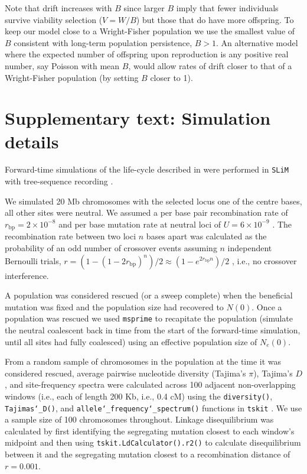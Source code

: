 \documentclass[]{article}
\begin{document}
Note that drift increases with $B$ since larger $B$ imply that fewer individuals survive viability selection ($V= W/B$) but those that do have more offspring.
To keep our model close to a Wright-Fisher population we use the smallest value of $B$ consistent with long-term population persistence, $B>1$.
An alternative model where the expected number of offspring upon reproduction is any positive real number, say Poisson with mean $B$, would allow rates of drift closer to that of a Wright-Fisher population (by setting $B$ closer to 1).

\section*{Supplementary text: Simulation details}
\label{sec:simdetails}

Forward-time simulations of the life-cycle described in  were performed in \texttt{SLiM} \citep[version 3.3;][]{Haller2019slim} with tree-sequence recording \citep{Haller2019tree}.

We simulated 20 Mb chromosomes with the selected locus one of the centre bases, all other sites were neutral.
We assumed a per base pair recombination rate of $r_\mathrm{bp}=2\times10^{-8}$ \citep[i.e., 2 cM/Mb; e.g.,][]{mackay2012drosophila} and per base mutation rate at neutral loci of $U=6\times10^{-9}$ \citep[e.g.,][]{haag2007direct}.
The recombination rate between two loci $n$ bases apart was calculated as the probability of an odd number of crossover events assuming $n$ independent Bernoulli trials, $r = (1-(1-2r_\mathrm{bp})^n)/2 \approx (1-e^{2 r_\mathrm{bp} n})/2$ \citep[equation 3 in][]{haldane1919combination}, i.e., no crossover interference.

A population was considered rescued (or a sweep complete) when the beneficial mutation was fixed and the population size had recovered to $N(0)$.
Once a population was rescued we used \texttt{msprime} \citep{kelleher2016efficient} to recapitate the population (simulate the neutral coalescent back in time from the start of the forward-time simulation, until all sites had fully coalesced) using an effective population size of $N_e(0)$.

From a random sample of chromosomes in the population at the time it was considered rescued, average pairwise nucleotide diversity (Tajima's $\pi$), Tajima's $D$, and site-frequency spectra were calculated across 100 adjacent non-overlapping windows (i.e., each of length 200 Kb, i.e., 0.4 cM) using the \texttt{diversity()}, \texttt{Tajimas\char`_D()}, and \texttt{allele\char`_frequency\char`_spectrum()} functions in \texttt{tskit} \cite[][]{kelleher2018efficient}.
We use a sample size of 100 chromosomes throughout.
Linkage disequilibrium was calculated by first identifying the segregating mutation closest to each window's midpoint and then using \texttt{tskit.LdCalculator().r2()} to calculate disequilibrium between it and the segregating mutation closest to a recombination distance of $r=0.001$.
 
\end{document}
